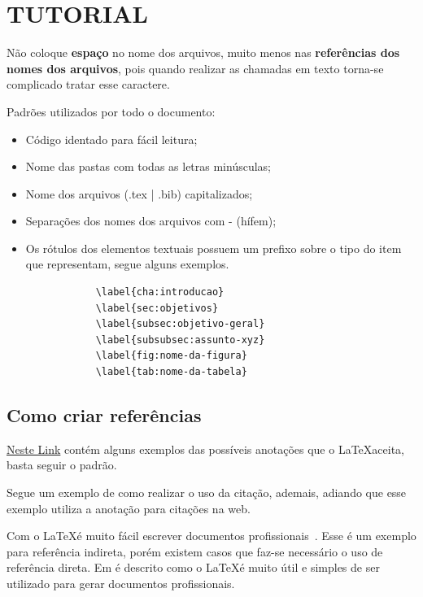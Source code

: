 \chapter{\textbf{TUTORIAL}}
    \label{cha:tutorial}
    
    Não coloque \textbf{espaço} no nome dos arquivos, muito menos nas \textbf{referências dos nomes dos arquivos}, pois quando realizar as chamadas em texto torna\hyp{se} complicado tratar esse caractere.
    
    Padrões utilizados por todo o documento:
    \begin{itemize}
        \item Código identado para fácil leitura;
        \item Nome das pastas com todas as letras minúsculas;
        \item Nome dos arquivos (.tex | .bib) capitalizados;
        \item Separações dos nomes dos arquivos com - (hífem);
        \item Os rótulos dos elementos textuais possuem um prefixo sobre o tipo do item que representam, segue alguns exemplos.
        \begin{verbatim} 
            \label{cha:introducao}
            \label{sec:objetivos}
            \label{subsec:objetivo-geral}
            \label{subsubsec:assunto-xyz}
            \label{fig:nome-da-figura}
            \label{tab:nome-da-tabela}
        \end{verbatim} 
    \end{itemize}
    
    \section{Como criar referências}
        \label{sec:referencias}
        
        \href{https://verbosus.com/bibtex-style-examples.html}{Neste Link} contém alguns exemplos das possíveis anotações que o \LaTeX aceita, basta seguir o padrão.
        
        Segue um exemplo de como realizar o uso da citação, ademais, adiando que esse exemplo utiliza a anotação para citações na web.
        
        Com o \LaTeX é muito fácil escrever documentos profissionais~\cite{latex1995}. Esse é um exemplo para referência indireta, porém existem casos que faz\hyp{se} necessário o uso de referência direta. Em  é descrito como o \LaTeX é muito útil e simples de ser utilizado para gerar documentos profissionais.
        
